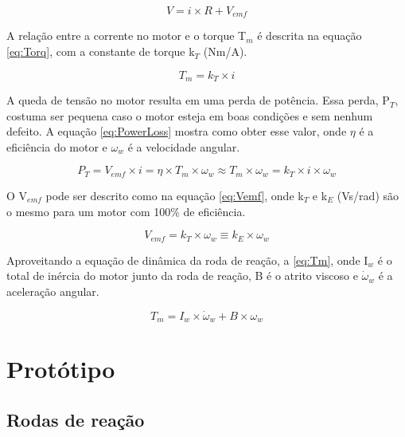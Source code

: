 \documentclass[
	12pt,				%
	openany,			%
	twoside,			%
	a4paper,			%
	english,			%
	french,				%
	spanish,			%
	brazil,				%
	oldfontcommands
	]{abntex2}
\begin{document}
\begin{equation}
V = i \times R + V_{emf}
\label{eq:Tens}
\end{equation}

A relação entre a corrente no motor e o torque T$_{m}$ é descrita na equação \ref{eq:Torq}, com a constante de torque k$_{T}$ (Nm/A).

\begin{equation}
T_{m} = k_{T} \times i
\label{eq:Torq}
\end{equation}

A queda de tensão no motor resulta em uma perda de potência. Essa perda, P$_{T}$, costuma ser pequena caso o motor esteja em boas condições e sem nenhum defeito. A equação \ref{eq:PowerLoss} mostra como obter esse valor, onde $\eta$ é a eficiência do motor e $\omega_{w}$ é a velocidade angular.

\begin{equation}
P_{T} = V_{emf} \times i = \eta \times T_{m} \times \omega_{w} \approx T_{m} \times \omega_{w} = k_{T} \times i \times \omega_{w}
\label{eq:PowerLoss}
\end{equation}

O V$_{emf}$ pode ser descrito como na equação \ref{eq:Vemf}, onde k$_{T}$ e k$_{E}$ (Vs/rad) são o mesmo para um motor com 100\% de eficiência.

\begin{equation}
V_{emf} = k_{T} \times \omega_{w} \equiv k_{E} \times \omega_{w}
\label{eq:Vemf}
\end{equation}

Aproveitando a equação de dinâmica da roda de reação, a \ref{eq:Tm}, onde I$_{w}$ é o total de inércia do motor junto da roda de reação, B é o atrito viscoso e $\dot{\omega}_{w}$ é a aceleração angular.

\begin{equation}
T_{m} = I_{w} \times \dot{\omega}_{w} + B \times \omega_{w}
\label{eq:Tm}
\end{equation}



\chapter[Protótipo]{Protótipo}



\section{Rodas de reação}
\end{document}
